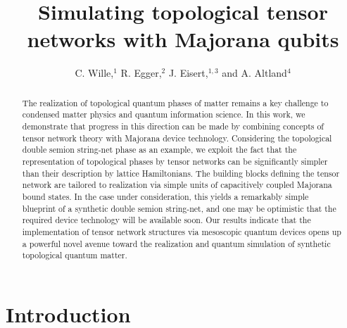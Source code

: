 \documentclass[twocolumn,floats,prx,showpacs]{revtex4-1}
\newcommand{\rein}[1]{{\color{rein} #1}}
\begin{document}
\title{Simulating topological tensor networks with Majorana qubits} 

\author{C. Wille,$^1$ R. Egger,$^2$ J. Eisert,$^{1,3}$ and A. Altland$^4$}

\begin{abstract}
The realization of topological quantum phases of matter remains a key challenge to condensed matter physics and quantum information science. In this work, we  demonstrate that progress in this direction can be made by combining concepts of tensor network theory with Majorana device technology. Considering the topological double semion string-net phase as an example, we exploit the fact that the representation of topological phases by tensor networks can be significantly simpler than their description by lattice Hamiltonians. The building blocks defining the tensor network are tailored to realization via simple units of capacitively coupled Majorana bound states. In the case under consideration,  this \rein{yields} a remarkably simple blueprint of a synthetic double semion string-net,
and one may be optimistic that the required device technology will be available soon.  Our results indicate that the implementation of  tensor network structures via mesoscopic quantum devices \rein{opens up a powerful novel avenue toward the realization and quantum simulation} of synthetic topological quantum matter.
\end{abstract}
\maketitle

\section{Introduction}
\end{document}
